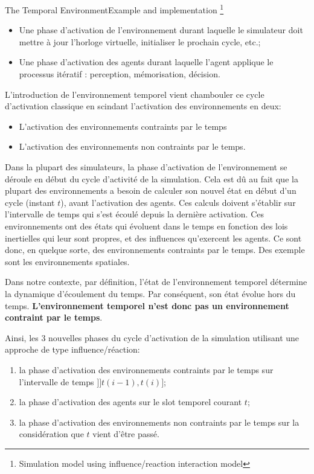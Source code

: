 \begin{frame}{The Temporal Environment}{Example and implementation \footnote{Simulation model using influence/reaction interaction model}}
{{\begin{itemize}
   \item Une phase d’activation de l’environnement durant laquelle le simulateur doit mettre à jour l’horloge virtuelle, initialiser le prochain cycle, etc.;
    \item Une phase d'activation des agents durant laquelle l'agent applique le processus itératif : perception, mémorisation, décision. 
\end{itemize}
L'introduction de l'environnement temporel vient chambouler ce cycle d'activation classique en scindant l'activation des environnements en deux:
\begin{itemize}
    \item L'activation des environnements contraints par le temps
    \item L'activation des environnements non contraints par le temps.
\end{itemize}
Dans la plupart des simulateurs, la phase d'activation de l'environnement se déroule en début du cycle d'activité de la simulation. Cela est dû au fait que la plupart des environnements a besoin de calculer son nouvel état en début d'un cycle (instant $t$), avant l'activation des agents. Ces calculs doivent  s'établir sur l'intervalle de temps qui s'est écoulé depuis la dernière activation. Ces environnements ont des états qui évoluent dans le temps en fonction des lois inertielles qui leur sont propres, et des influences qu'exercent les agents. Ce sont donc, en quelque sorte, des environnements contraints par le temps. Des exemple sont les environnements spatiales.
\par Dans notre contexte, par définition, l'état de l'environnement temporel détermine la dynamique d'écoulement du temps. Par conséquent, son état évolue hors du temps. \textbf{L'environnement temporel n'est donc pas un environnement contraint par le temps}. 
\par Ainsi, les 3 nouvelles phases du cycle d'activation de la simulation utilisant une approche de type influence/réaction:
\begin{enumerate}
    \item la phase d'activation des environnements contraints par le temps sur l'intervalle de temps $] ]t(i-1), t(i)]$; 
    \item la phase d'activation des agents sur le slot temporel courant $t$;
    \item la phase d'activation des environnements non contraints par le temps sur la considération que $t$ vient d'être passé.
\end{enumerate}
}
}
\end{frame}


